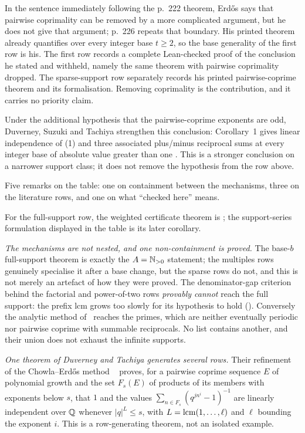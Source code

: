 \documentclass[11pt]{article}
\begin{document}
\noindent In the sentence immediately following the p.~222 theorem,
Erd\H{o}s says that pairwise coprimality can be removed by a more complicated
argument, but he does not give that argument; p.~226 repeats that boundary.
His printed theorem already quantifies over every integer base $t\ge2$, so the
base generality of the first row is his.  The first row records a complete
Lean-checked proof of the conclusion he stated and withheld, namely the same
theorem with pairwise coprimality dropped.  The sparse-support row separately
records his printed pairwise-coprime theorem and its formalisation.  Removing
coprimality is the contribution, and it carries no priority claim.

Under the additional hypothesis that the pairwise-coprime exponents are odd,
Duverney, Suzuki and Tachiya strengthen this conclusion: Corollary~1 gives
linear independence of (1) and three associated plus/minus reciprocal sums
at every integer base of absolute value greater than one
\cite[Corollary~1]{duverneysuzukitachiya2019}.  This is a stronger conclusion
on a narrower support class; it does not remove the hypothesis from the row
above.

\noindent Five remarks on the table: one on containment between the
mechanisms, three on the literature rows, and one on what ``checked here''
means.

For the full-support row, the weighted certificate theorem is
;
the support-series formulation displayed in the table is its later corollary.

\emph{The mechanisms are not nested, and one non-containment is proved.}  The
base-$b$ full-support theorem is exactly the $A=\mathbb{N}_{>0}$ statement; the
multiples rows genuinely specialise it after a base change, but the sparse
rows do not, and this is not merely an artefact of how they were proved.  The
denominator-gap criterion behind the factorial and power-of-two rows
\emph{provably cannot} reach the full support: the prefix lcm grows too slowly
for its hypothesis to hold
().
Conversely the analytic method of~\cite{taoteravainen2025} reaches the primes,
which are neither eventually periodic nor pairwise coprime with summable
reciprocals.  No list contains another, and their union does not exhaust the
infinite supports.

\emph{One theorem of Duverney and Tachiya generates several rows.}
Their refinement of the Chowla--Erd\H{o}s method
~\cite[Cor.~1.2, author-preprint p.~4; proof pp.~9--11]{duverneytachiya}
proves, for a pairwise coprime sequence $E$ of polynomial growth and the set
$F_s(E)$ of products of its members with exponents below $s$, that
$1$ and the values $\sum_{n\in F_s}(q^{jn^i}-1)^{-1}$ are linearly independent
over $\mathbb{Q}$ whenever $|q|^{L}\le s$, with $L=\operatorname{lcm}(1,\dots,\ell)$ and $\ell$
bounding the exponent $i$.  This is a
row-generating theorem, not an isolated example.
\end{document}
